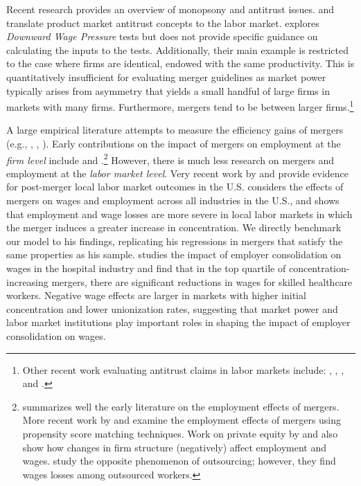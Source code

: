 \documentclass[12pt]{article}
\theoremstyle{prop}
\begin{document}
Recent research provides an overview of monopsony and antitrust issues. 
\citet{naidu2018antitrust} and \citet{marinescu2019anticompetitive} translate product market antitrust concepts to the labor market. 
\citet{naidu2018antitrust} explores \emph{Downward Wage Pressure} tests but does not provide specific guidance on calculating the inputs to the tests. 
Additionally, their main example is restricted to the case where firms are identical, endowed with the same productivity. 
This is quantitatively insufficient for evaluating merger guidelines as market power typically arises from asymmetry that yields a small handful of large firms in markets with many firms.
Furthermore, mergers tend to be between larger firms.\footnote{
    Other recent work evaluating antitrust claims in labor markets include: \citet{hemphill2018mergers}, \citet{hovenkamp2022worker}, \citet{alexander2023antitrust}, and \citet{masur2022horizontal}.} 
 
A large empirical literature attempts to measure the efficiency gains of mergers (e.g., \citet{maksimovic2001market}, \citet{blonigen2016evidence}, \citet{malmendier2018winning}). 
Early contributions on the impact of mergers on employment at the \emph{firm level} include \citet{conyon2002impact} and \citet{gugler2004effects}.\footnote{
	\citet{gugler2004effects} summarizes well the early literature on the employment effects of mergers. 
    More recent work by \citet{ouimet2016acquiring} and  \citet{geurts2017employment} examine the employment effects of mergers using propensity score matching techniques. 
    Work on private equity by \citet{davis2014private} and  \citet{olsson2017private} also show how changes in firm structure (negatively) affect employment and wages. 
    \citet{goldschmidt2017rise} study the opposite phenomenon of outsourcing; however, they find wages losses among outsourced workers.}
However, there is much less research on mergers and employment at the \emph{labor market level}. 
Very recent work by \citet{Arnold} and \citet{prager2021mergers} provide evidence for post-merger local labor market outcomes in the U.S.  
\citet{Arnold} considers the effects of mergers on wages and employment across all industries in the U.S., and
shows that employment and wage losses are more severe in local labor markets in which the merger induces a greater increase in concentration. 
We directly benchmark our model to his findings, replicating his regressions in mergers that satisfy the same properties as his sample. 
\citet{prager2021mergers} studies the impact of employer consolidation on wages in the hospital industry and find that in the top quartile of concentration-increasing mergers, there are significant reductions in wages for skilled healthcare workers. 
Negative wage effects are larger in markets with higher initial concentration and lower unionization rates, suggesting that market power and labor market institutions play important roles in shaping the impact of employer consolidation on wages. 
\end{document}

